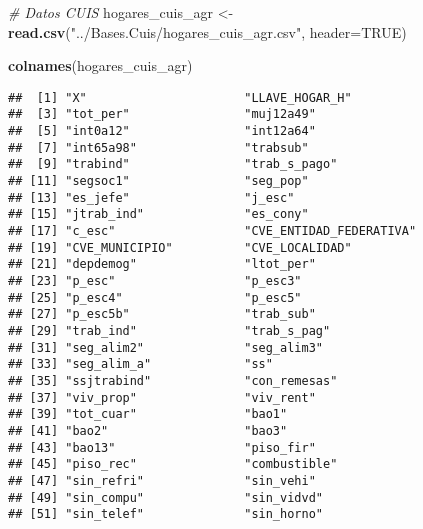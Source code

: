 \documentclass[11pt,]{article}
\newenvironment{Shaded}{\begin{snugshade}}{\end{snugshade}}
\newcommand{\KeywordTok}[1]{\textcolor[rgb]{0.13,0.29,0.53}{\textbf{#1}}}
\newcommand{\DataTypeTok}[1]{\textcolor[rgb]{0.13,0.29,0.53}{#1}}
\newcommand{\StringTok}[1]{\textcolor[rgb]{0.31,0.60,0.02}{#1}}
\newcommand{\CommentTok}[1]{\textcolor[rgb]{0.56,0.35,0.01}{\textit{#1}}}
\newcommand{\OtherTok}[1]{\textcolor[rgb]{0.56,0.35,0.01}{#1}}
\newcommand{\NormalTok}[1]{#1}
\begin{document}
\begin{Shaded}
\begin{Highlighting}[]
\CommentTok{# Datos CUIS}
\NormalTok{hogares_cuis_agr <-}\StringTok{ }\KeywordTok{read.csv}\NormalTok{(}\StringTok{"../Bases.Cuis/hogares_cuis_agr.csv"}\NormalTok{, }\DataTypeTok{header=}\OtherTok{TRUE}\NormalTok{)}

\KeywordTok{colnames}\NormalTok{(hogares_cuis_agr)}
\end{Highlighting}
\end{Shaded}

\begin{verbatim}
##  [1] "X"                      "LLAVE_HOGAR_H"         
##  [3] "tot_per"                "muj12a49"              
##  [5] "int0a12"                "int12a64"              
##  [7] "int65a98"               "trabsub"               
##  [9] "trabind"                "trab_s_pago"           
## [11] "segsoc1"                "seg_pop"               
## [13] "es_jefe"                "j_esc"                 
## [15] "jtrab_ind"              "es_cony"               
## [17] "c_esc"                  "CVE_ENTIDAD_FEDERATIVA"
## [19] "CVE_MUNICIPIO"          "CVE_LOCALIDAD"         
## [21] "depdemog"               "ltot_per"              
## [23] "p_esc"                  "p_esc3"                
## [25] "p_esc4"                 "p_esc5"                
## [27] "p_esc5b"                "trab_sub"              
## [29] "trab_ind"               "trab_s_pag"            
## [31] "seg_alim2"              "seg_alim3"             
## [33] "seg_alim_a"             "ss"                    
## [35] "ssjtrabind"             "con_remesas"           
## [37] "viv_prop"               "viv_rent"              
## [39] "tot_cuar"               "bao1"                  
## [41] "bao2"                   "bao3"                  
## [43] "bao13"                  "piso_fir"              
## [45] "piso_rec"               "combustible"           
## [47] "sin_refri"              "sin_vehi"              
## [49] "sin_compu"              "sin_vidvd"             
## [51] "sin_telef"              "sin_horno"
\end{verbatim}
\end{document}
